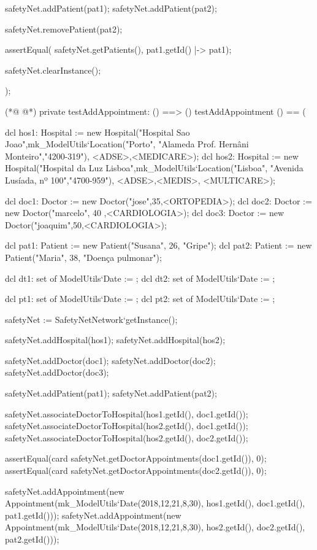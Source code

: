 \begin{vdmpp}[breaklines=true]
  safetyNet.addPatient(pat1);
  safetyNet.addPatient(pat2);
  
  safetyNet.removePatient(pat2);

  assertEqual( safetyNet.getPatients(), {pat1.getId() |-> pat1});
  
  safetyNet.clearInstance();
    
);

(*@
\label{testAddAppointment:557}
@*)
private testAddAppointment: () ==> ()
 testAddAppointment () == (
 
  dcl hos1: Hospital := new Hospital("Hospital Sao Joao",mk_ModelUtils`Location("Porto", "Alameda Prof. Hernâni Monteiro","4200-319"), {<ADSE>,<MEDICARE>});
  dcl hos2: Hospital := new Hospital("Hospital da Luz Lisboa",mk_ModelUtils`Location("Lisboa", "Avenida Lusíada, nº 100","4700-959"), {<ADSE>,<MEDIS>, <MULTICARE>});
  
  dcl doc1: Doctor := new Doctor("jose",35,<ORTOPEDIA>);
  dcl doc2: Doctor := new Doctor("marcelo", 40 ,<CARDIOLOGIA>);
  dcl doc3: Doctor := new Doctor("joaquim",50,<CARDIOLOGIA>);
  
  dcl pat1: Patient := new Patient("Susana", 26, "Gripe");
  dcl pat2: Patient := new Patient("Maria", 38, "Doença pulmonar");
  
  dcl dt1: set of ModelUtils`Date := {};
  dcl dt2: set of ModelUtils`Date := {};
  
  dcl pt1: set of ModelUtils`Date := {};
  dcl pt2: set of ModelUtils`Date := {};
  
  safetyNet := SafetyNetNetwork`getInstance();
   
  safetyNet.addHospital(hos1);
  safetyNet.addHospital(hos2);
  
  safetyNet.addDoctor(doc1);
  safetyNet.addDoctor(doc2);
  safetyNet.addDoctor(doc3);
  
  safetyNet.addPatient(pat1);
  safetyNet.addPatient(pat2);

  safetyNet.associateDoctorToHospital(hos1.getId(), doc1.getId());
  safetyNet.associateDoctorToHospital(hos2.getId(), doc1.getId());
  safetyNet.associateDoctorToHospital(hos2.getId(), doc2.getId());

  assertEqual(card safetyNet.getDoctorAppointments(doc1.getId()), 0);
  assertEqual(card safetyNet.getDoctorAppointments(doc2.getId()), 0);

  safetyNet.addAppointment(new Appointment(mk_ModelUtils`Date(2018,12,21,8,30), hos1.getId(), doc1.getId(), pat1.getId()));
  safetyNet.addAppointment(new Appointment(mk_ModelUtils`Date(2018,12,21,8,30), hos2.getId(), doc2.getId(), pat2.getId()));


\end{vdmpp}
